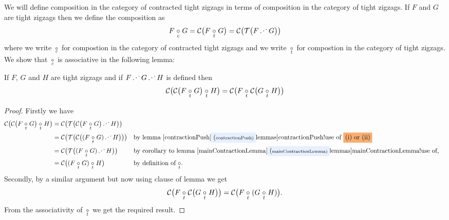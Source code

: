\newcommand{\contigh}[2]
{\contract{\tighten{#1 \cnc #2}}}
\newcommand{\compC}{\mathrel{\underset{c}{\circ}}}
\newcommand{\compT}{\mathrel{\underset{t}{\circ}}}

We will define 
composition in the category of contracted tight zigzags 
in terms of composition in the category of tight zigzags.
If $F$ and $G$ are tight zigzags then we define the composition 
as 
\[
F \compC G = \contract{F \compT G} = \contract{\tighten{F \cnc G}}
\]
where we write $\compC$ for compostion in the category of
contracted tight zigzags 
and we write $\compT$ for compostion in the 
category of tight zigzags.
We show that $\compC$ is associative in the following lemma:

\begin{lemma}
If $F$, $G$ and $H$ are tight zigzags
 and if $F \cnc G \cnc H$
is defined then
\[
\contract{\contract{F \compT G} \compT H}
= \contract{F \compT \contract{G \compT H}}
\]
\end{lemma}
\begin{proof}
Firstly we have 
\begin{align*}
\contract{\contract{F \compT G} \compT H}
  &= \contigh{\contract{F \compT G}}{H}\\ 
  &= \contract{\tighten{\contract{(F \compT G) \cnc H}}}
  && \mbox{by lemma \lref{contractionPush}
                             \workt{(i) or (ii)} 
           }\\
  &= \contract{\tighten{(F \compT G) \cnc H}}
  && \mbox{by corollary to lemma \lref{mainContractionLemma},} \\
  &= \contract{(F \compT G) \compT H}
  && \mbox{by definition of $\compT$.}\\
\end{align*}
Secondly,  by a similar argument but now using clause  
of lemma  we get
\[
\contract{F \compT \contract{G \compT H}} 
= \contract{F \compT (G \compT H)}.
\]
From the associativity of $\compT$ we get the required result.
\end{proof}

